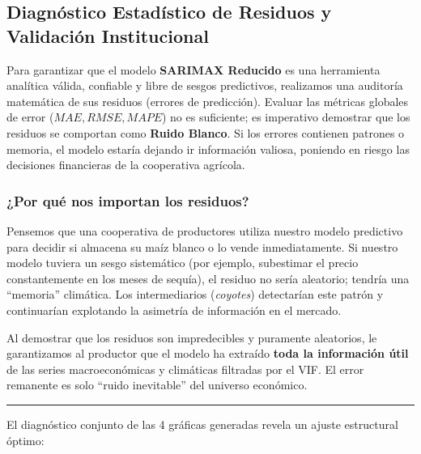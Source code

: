 \documentclass[11pt]{article}
\begin{document}
    \hypertarget{diagnuxf3stico-estaduxedstico-de-residuos-y-validaciuxf3n-institucional}{%
\subsection{Diagnóstico Estadístico de Residuos y Validación
Institucional}\label{diagnuxf3stico-estaduxedstico-de-residuos-y-validaciuxf3n-institucional}}

Para garantizar que el modelo \textbf{SARIMAX Reducido} es una
herramienta analítica válida, confiable y libre de sesgos predictivos,
realizamos una auditoría matemática de sus residuos (errores de
predicción). Evaluar las métricas globales de error
(\(MAE, RMSE, MAPE\)) no es suficiente; es imperativo demostrar que los
residuos se comportan como \textbf{Ruido Blanco}. Si los errores
contienen patrones o memoria, el modelo estaría dejando ir información
valiosa, poniendo en riesgo las decisiones financieras de la cooperativa
agrícola.

\hypertarget{por-quuxe9-nos-importan-los-residuos}{%
\subsubsection{¿Por qué nos importan los
residuos?}\label{por-quuxe9-nos-importan-los-residuos}}

Pensemos que una cooperativa de productores utiliza nuestro modelo
predictivo para decidir si almacena su maíz blanco o lo vende
inmediatamente. Si nuestro modelo tuviera un sesgo sistemático (por
ejemplo, subestimar el precio constantemente en los meses de sequía), el
residuo no sería aleatorio; tendría una ``memoria'' climática. Los
intermediarios (\emph{coyotes}) detectarían este patrón y continuarían
explotando la asimetría de información en el mercado.

Al demostrar que los residuos son impredecibles y puramente aleatorios,
le garantizamos al productor que el modelo ha extraído \textbf{toda la
información útil} de las series macroeconómicas y climáticas filtradas
por el VIF. El error remanente es solo ``ruido inevitable'' del universo
económico.

\begin{center}\rule{0.5\linewidth}{0.5pt}\end{center}

El diagnóstico conjunto de las 4 gráficas generadas revela un ajuste
estructural óptimo:
\end{document}
